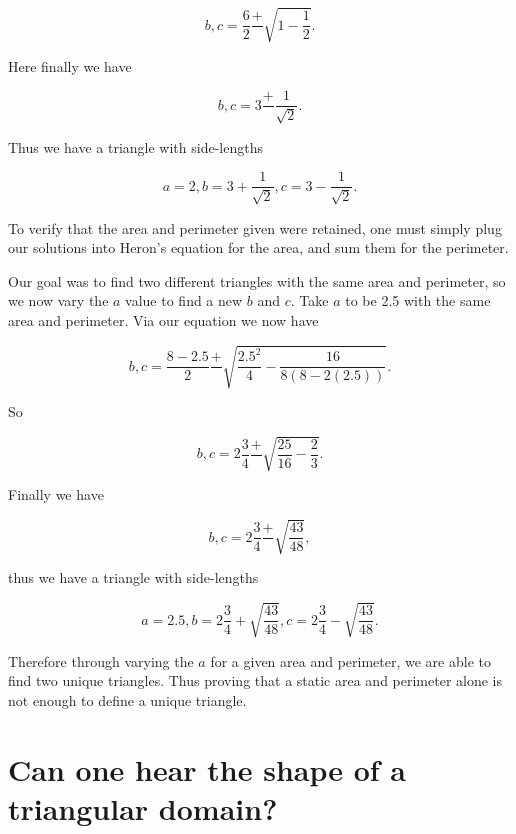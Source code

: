 \documentclass[12pt]{report}
\numberwithin{definition}{section}
\begin{document}
  


\[b, c=  \frac{6}{2}\frac{+}{}\sqrt{1-\frac{1}{2}}.\]

  


Here  finally we have 

  

\[b, c=  3\frac{+}{}\frac{1}{\sqrt{2}}.\]

  


	Thus we have a triangle with side-lengths 

  


	\[a = 2, b = 3+\frac{1}{\sqrt{2}},  c=  3-\frac{1}{\sqrt{2}}.\]
	
	  
	
	
	To verify that the area and perimeter given were retained, one must simply plug our solutions into Heron's equation for the area, and sum them for the perimeter. 
	
  

	Our goal was to find two different triangles with the same area and perimeter, so we now vary the $a$ value to find a new $b$ and $c$.  Take $a$ to be 2.5 with the same area and perimeter. Via our equation we now have 
	
	  
	
	
	\[b, c=  \frac{8-2.5}{2}\frac{+}{}\sqrt{\frac{2.5^2}{4}-\frac{16}{8(8-2(2.5))}}.\]
	
	  
	
	
So 

  


	\[b, c=  2\frac{3}{4}\frac{+}{}\sqrt{\frac{25}{16}-\frac{2}{3}}.\]
	
	  
	
	
Finally we have 

  

	\[b, c=  2\frac{3}{4}\frac{+}{}\sqrt{\frac{43}{48}},\]
	
	  
	
	
thus we have a triangle with side-lengths 

  


\[a = 2.5, b = 2\frac{3}{4}+{\sqrt{\frac{43}{48}}},  c=  2\frac{3}{4}-{\sqrt{\frac{43}{48}}}.\]



  


Therefore through varying the $a$ for a given area and perimeter, we are able to find two unique triangles. Thus proving that a static area and perimeter alone is not enough to define a unique triangle. 

\break

\section{Can one hear the shape of a triangular domain?}
\end{document}
